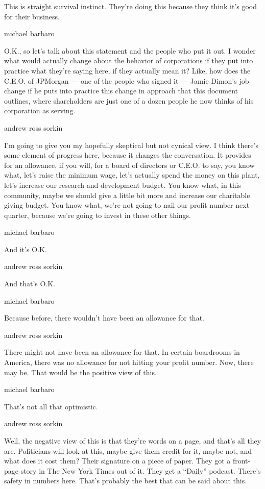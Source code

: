 This is straight survival instinct. They're doing this because they
think it's good for their business.

michael barbaro

O.K., so let's talk about this statement and the people who put it out.
I wonder what would actually change about the behavior of corporations
if they put into practice what they're saying here, if they actually
mean it? Like, how does the C.E.O. of JPMorgan --- one of the people who
signed it --- Jamie Dimon's job change if he puts into practice this
change in approach that this document outlines, where shareholders are
just one of a dozen people he now thinks of his corporation as serving.

andrew ross sorkin

I'm going to give you my hopefully skeptical but not cynical view. I
think there's some element of progress here, because it changes the
conversation. It provides for an allowance, if you will, for a board of
directors or C.E.O. to say, you know what, let's raise the minimum wage,
let's actually spend the money on this plant, let's increase our
research and development budget. You know what, in this community, maybe
we should give a little bit more and increase our charitable giving
budget. You know what, we're not going to nail our profit number next
quarter, because we're going to invest in these other things.

michael barbaro

And it's O.K.

andrew ross sorkin

And that's O.K.

michael barbaro

Because before, there wouldn't have been an allowance for that.

andrew ross sorkin

There might not have been an allowance for that. In certain boardrooms
in America, there was no allowance for not hitting your profit number.
Now, there may be. That would be the positive view of this.

michael barbaro

That's not all that optimistic.

andrew ross sorkin

Well, the negative view of this is that they're words on a page, and
that's all they are. Politicians will look at this, maybe give them
credit for it, maybe not, and what does it cost them? Their signature on
a piece of paper. They got a front-page story in The New York Times out
of it. They get a ``Daily'' podcast. There's safety in numbers here.
That's probably the best that can be said about this.


